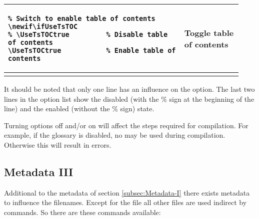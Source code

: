 \begin{footnotesize}
\begin{longtable}{ | P{0.7\linewidth} | p{0.23\linewidth} | }
        \hline
        \begin{BVerbatim}
\newif\ifUseTsTOC
\UseTsTOCtrue           %
        \end{BVerbatim}
         & Toggle table \newline of contents                                    \\
        \hline
    \end{longtable}
\end{footnotesize}

It should be noted that only one line has an influence on the option. The last
two lines in the option list show the disabled (with the \% sign at the
beginning of the line) and the enabled (without the \% sign) state.
\bigbreak

 Turning options off and/or on will affect the steps
required for compilation. For example, if the glossary is disabled, no
 may be used during compilation. Otherwise this will
result in errors.

\subsection{Metadata III}\label{subsec:Metadata-III}

Additional to the metadata of section \ref{subsec:Metadata-I} there exists
metadata to influence the filenames. Except for the
 file all other files are used indirect
by commands. So there are these commands available:

